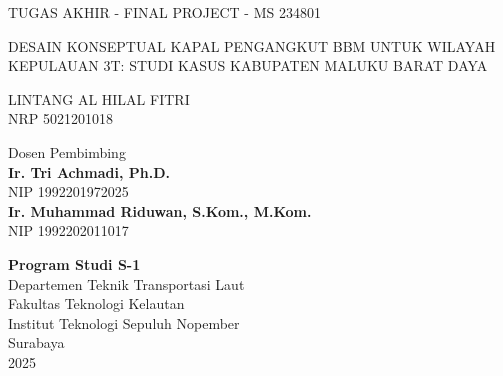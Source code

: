 {\large TUGAS AKHIR - FINAL PROJECT - MS 234801}

\vspace{8ex}

\begin{Large}
  DESAIN KONSEPTUAL KAPAL PENGANGKUT BBM UNTUK WILAYAH KEPULAUAN 3T: STUDI KASUS KABUPATEN MALUKU BARAT DAYA
\end{Large}

\vspace{10ex}

\begin{large}
  

LINTANG AL HILAL FITRI \\
NRP 5021201018

\vspace{4ex}

Dosen Pembimbing \\
\textbf{Ir. Tri Achmadi, Ph.D.}\\
NIP 1992201972025 \\
\textbf{Ir. Muhammad Riduwan, S.Kom., M.Kom.}\\
NIP 1992202011017

\end{large}

\vspace{8ex}

\textbf{Program Studi S-1} \\
Departemen Teknik Transportasi Laut \\
Fakultas Teknologi Kelautan \\
Institut Teknologi Sepuluh Nopember \\
Surabaya \\
2025
